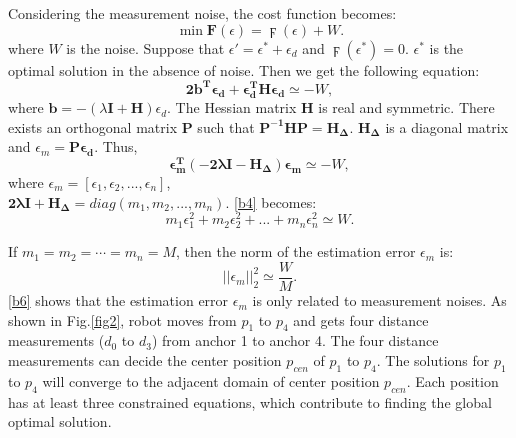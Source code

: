 \documentclass[journal]{IEEEtran}
\begin{document}
Considering the measurement noise, the cost function becomes:
\begin{equation}\label{b2}
\min   \mathbf F(\epsilon) = \digamma(\epsilon) + W.
\end{equation}
where $W$ is the noise. Suppose that $\epsilon' = \epsilon^{\ast} + \epsilon_d$ and $\digamma(\epsilon^{\ast}) = 0$. $\epsilon^{\ast}$ is the optimal solution in the absence of noise. Then we get the following equation:
\begin{equation}\label{b3}
\mathbf {2b^{T} \epsilon_d + \epsilon_d^{T}H\epsilon_d} \simeq - W,
\end{equation}
where $\mathbf{b} =  -(\lambda \mathbf{I} + \mathbf{H})\epsilon_d$. The Hessian matrix $\mathbf H$ is real and symmetric. There exists an orthogonal matrix $\mathbf P$ such that $\mathbf{P^{-1}HP = H_\Delta}$. $\mathbf{H_\Delta}$ is a diagonal matrix and $\epsilon_{m} = \mathbf{P\epsilon_d}$. Thus,
\begin{equation}\label{b4}
\mathbf { \epsilon_{m}^{T}(-2\lambda I - H_\Delta) \epsilon_{m}} \simeq - W,
\end{equation}
where $\epsilon_{m} = [\epsilon_1,\epsilon_2,...,\epsilon_n]$, \\ $\mathbf{2\lambda I + H_\Delta} = diag(m_1, m_2,..., m_n)$. \eqref{b4} becomes:
\begin{equation}\label{b5}
m_1\epsilon_1^{2} + m_2\epsilon_2^{2} +...+ m_n\epsilon_n^{2}
\simeq  W. 
\end{equation}

If $m_1=m_2=\cdots=m_n = M$, then the norm of the estimation error $\epsilon_m$ is:
\begin{equation}\label{b6}
||\epsilon_m||_2^{2} \simeq  \frac{W}{M}.
\end{equation}
\eqref{b6} shows that the estimation error $\epsilon_m$ is only related to measurement noises. As shown in Fig.\ref{fig2}, robot moves from $p_1$ to $p_4$ and gets four distance measurements ($d_0$ to $d_3$) from anchor 1 to anchor 4. The four distance measurements can decide the center position $p_{cen}$ of $p_1$ to $p_4$. The solutions for $p_1$ to $p_4$ will converge to the adjacent domain of center position $p_{cen}$.
Each position has at least three constrained equations, which contribute to finding the global optimal solution. 
\end{document}
